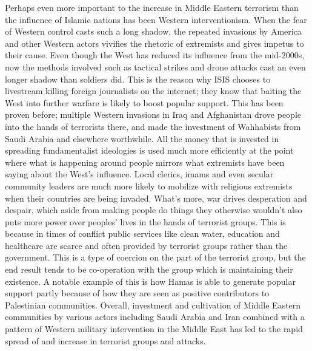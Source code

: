 \documentclass[10pt,a4paper]{article}
\newcounter{count}
\begin{document}
\begin{multicols}{2}
Perhaps even more important to the increase in Middle Eastern terrorism than the influence of Islamic nations has been Western interventionism. When the fear of Western control casts such a long shadow, the repeated invasions by America and other Western actors vivifies the rhetoric of extremists and gives impetus to their cause. Even though the West has reduced its influence from the mid-2000s, now the methods involved such as tactical strikes and drone attacks cast an even longer shadow than soldiers did. This is the reason why ISIS chooses to livestream killing foreign journalists on the internet; they know that baiting the West into further warfare is likely to boost popular support. This has been proven before; multiple Western invasions in Iraq and Afghanistan drove people into the hands of terrorists there, and made the investment of Wahhabists from Saudi Arabia and elsewhere worthwhile.  All the money that is invested in spreading fundamentalist ideologies is used much more efficiently at the point where what is happening around people mirrors what extremists have been saying about the West’s influence. Local clerics, imams and even secular community leaders are much more likely to mobilize with religious extremists when their countries are being invaded. What’s more, war drives desperation and despair, which aside from making people do things they otherwise wouldn’t also puts more power over peoples’ lives in the hands of terrorist groups. This is because in times of conflict public services like clean water, education and healthcare are scarce and often provided by terrorist groups rather than the government. This is a type of coercion on the part of the terrorist group, but the end result tends to be co-operation with the group which is maintaining their existence. A notable example of this is how Hamas is able to generate popular support partly because of how they are seen as positive contributors to Palestinian communities. Overall, investment and cultivation of Middle Eastern communities by various actors including Saudi Arabia and Iran combined with a pattern of Western military intervention in the Middle East has led to the rapid spread of and increase in terrorist groups and attacks.


\end{multicols}
\end{document}
